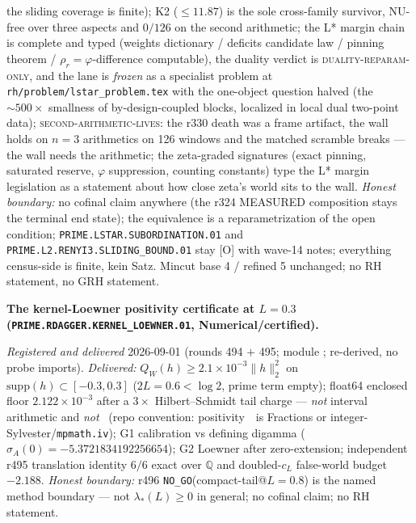 {the sliding coverage is finite); K2 ($\le 11.87$) is the sole
cross-family survivor, NU-free over three aspects and $0/126$ on
the second arithmetic; the L* margin chain is complete and typed
(weights dictionary / deficits candidate law / pinning theorem /
$\rho_r = \varphi$-difference computable), the duality verdict is
\textsc{duality-reparam-only}, and the lane is \emph{frozen} as a
specialist problem at \texttt{rh/problem/lstar\_problem.tex} with
the one-object question halved (the $\sim500\times$ smallness of
by-design-coupled blocks, localized in local dual two-point data);
\textsc{second-arithmetic-lives}: the r330 death was a frame
artifact, the wall holds on $n = 3$ arithmetics on 126 windows and
the matched scramble breaks --- the wall needs the arithmetic; the
zeta-graded signatures (exact pinning, saturated reserve, $\varphi$
suppression, counting constants) type the L* margin legislation as
a statement about how close zeta's world sits to the wall.
\emph{Honest boundary:} no cofinal claim anywhere (the r324
MEASURED composition stays the terminal end state); the equivalence
is a reparametrization of the open condition;
\texttt{PRIME.LSTAR.\allowbreak SUBORDINATION.01} and
\texttt{PRIME.L2.\allowbreak RENYI3.\allowbreak SLIDING\_BOUND.01}
stay [O] with wave-14 notes; everything census-side is finite,
kein Satz.  Mincut base 4 / refined 5 unchanged; no RH statement,
no GRH statement.\par}


\par\smallskip\noindent\textbf{The kernel-Loewner positivity certificate at $L=0.3$
(\texttt{PRIME.RDAGGER.\allowbreak KERNEL\_LOEWNER.01}, Numerical/certified).}
{\sloppy
\emph{Registered and delivered} 2026-09-01 (rounds 494 $+$ 495; module
; re-derived, no probe imports).
\emph{Delivered:} $Q_W(h)\ge 2.1{\times}10^{-3}\|h\|_2^2$ on
$\mathrm{supp}(h)\subset[-0.3,0.3]$ ($2L=0.6<\log 2$, prime term empty);
float64 enclosed floor $2.122{\times}10^{-3}$ after a $3\times$ Hilbert--Schmidt
tail charge --- \emph{not} interval arithmetic and \emph{not}~\mE
(repo convention: positivity~\mE\ is Fractions or integer-Sylvester/\texttt{mpmath.iv});
G1 calibration vs defining digamma
($\sigma_A(0)=-5.3721834192256654$); G2 Loewner after zero-extension;
independent r495 translation identity $6/6$ exact over $\mathbb Q$ and
doubled-$c_L$ false-world budget $-2.188$.  \emph{Honest boundary:} r496
\texttt{NO\_GO}(compact-tail@$L=0.8$) is the named method boundary --- not
$\lambda_*(L)\ge 0$ in general; no cofinal claim; no RH statement.\par}


